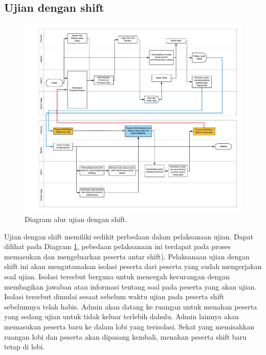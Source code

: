     \subsection{Ujian dengan shift}
        \begin{figure}
            \centering
            \includegraphics[height=0.8\paperwidth]{Gambar/flowchart/exam-flow-ujian-shift.pdf}
            \caption{Diagram alur ujian dengan shift.}
            \label{fig:flowchart-exam-exam-with-shift}
        \end{figure}
        Ujian dengan shift memiliki sedikit perbedaan dalam pelaksanaan ujian.
        Dapat dilihat pada Diagram \ref{fig:flowchart-exam-exam-with-shift},
        pebedaan pelaksanaan ini terdapat pada proses memasukan dan mengeluarkan
        peserta antar shift). Pelaksanaan ujian dengan shift ini akan
        mengutamakan isolasi peserta dari peserta yang sudah mengerjakan soal
        ujian. Isolasi tersebut berguna untuk mencegah kecurangan dengan
        membagikan jawaban atau informasi tentang soal pada peserta yang akan
        ujian. Isolasi tersebut dimulai sesaat sebelum waktu ujian pada peserta
        shift sebelumnya telah habis. Admin akan datang ke ruangan untuk
        menahan peserta yang sedang ujian untuk tidak keluar terlebih dahulu.
        Admin lainnya akan memasukan peserta baru ke dalam lobi yang terisolasi.
        Sekat yang memisahkan ruangan lobi dan peserta akan dipasang kembali,
        menahan peserta shift baru tetap di lobi.
        
